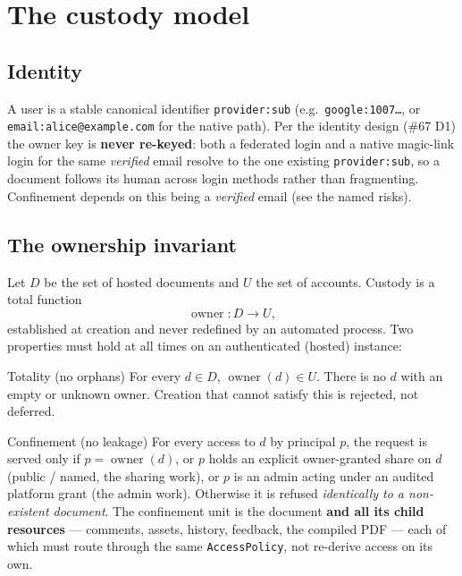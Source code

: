 \documentclass[11pt]{article}
\begin{document}
\section{The custody model}
\label{sec:model}

\subsection{Identity}
A user is a stable canonical identifier \texttt{provider:sub} (e.g.\
\texttt{google:1007\ldots}, or \texttt{email:alice@example.com} for the native path). Per the
identity design (\#67 D1) the owner key is \textbf{never re-keyed}: both a federated login and a
native magic-link login for the same \emph{verified} email resolve to the one existing
\texttt{provider:sub}, so a document follows its human across login methods rather than
fragmenting. Confinement depends on this being a \emph{verified} email (see the named risks).

\subsection{The ownership invariant}
Let $D$ be the set of hosted documents and $U$ the set of accounts. Custody is a total function
\[
  \operatorname{owner} : D \rightarrow U,
\]
established at creation and never redefined by an automated process. Two properties must hold at
all times on an authenticated (hosted) instance:

\begin{invariant}{Totality (no orphans)}
For every $d \in D$, $\operatorname{owner}(d) \in U$. There is no $d$ with an empty or unknown
owner. Creation that cannot satisfy this is rejected, not deferred.
\end{invariant}

\begin{invariant}{Confinement (no leakage)}
For every access to $d$ by principal $p$, the request is served only if $p =
\operatorname{owner}(d)$, or $p$ holds an explicit owner-granted share on $d$ (public / named,
the sharing work), or $p$ is an admin acting under an audited platform grant (the admin work).
Otherwise it is refused \emph{identically to a non-existent document}. The confinement unit is
the document \textbf{and all its child resources} --- comments, assets, history, feedback, the
compiled PDF --- each of which must route through the same \texttt{AccessPolicy}, not re-derive
access on its own.
\end{invariant}
\end{document}
